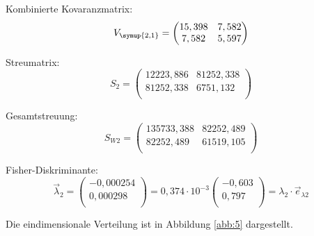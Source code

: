 Kombinierte Kovaranzmatrix:
\begin{equation*}
  V_{\symup{2,1}} = \begin{pmatrix}
                  15,398 &  7,582 \\
                  7,582 &  5,597 \\
  \end{pmatrix}
\end{equation*}

Streumatrix:
\begin{equation*}
  S_2 = \begin{pmatrix}
                  12223,886 & 81252,338 \\
                  81252,338 & 6751,132 \\
  \end{pmatrix}
\end{equation*}

Gesamtstreuung:
\begin{equation*}
  S_{W2} = \begin{pmatrix}
                  135733,388 & 82252,489 \\
                  82252,489 & 61519,105 \\
  \end{pmatrix}
\end{equation*}

Fisher-Diskriminante:
\begin{equation*}
  \vec{\lambda}_2 = \begin{pmatrix}
                  -0,000254 \\
                  0,000298 \\
  \end{pmatrix}
  = 0,374 \cdot 10^{-3} \begin{pmatrix}
                  -0,603 \\
                  0,797 \\
  \end{pmatrix}
  = \lambda_2 \cdot \vec{e}_{\lambda2}
\end{equation*}

Die eindimensionale Verteilung ist in Abbildung \ref{abb:5} dargestellt.


